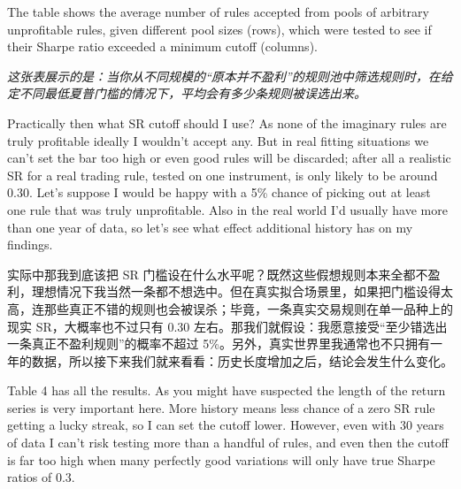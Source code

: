 \begin{englishblock} The table shows the average number of rules accepted from pools of arbitrary unprofitable rules, given different pool sizes (rows), which were tested to see if their Sharpe ratio exceeded a minimum cutoff (columns). \end{englishblock}

\begin{chineseblock} \textit{这张表展示的是：当你从不同规模的“原本并不盈利”的规则池中筛选规则时，在给定不同最低夏普门槛的情况下，平均会有多少条规则被误选出来。}\end{chineseblock}

\bipairgap

\begin{englishblock} Practically then what SR cutoff should I use? As none of the imaginary rules are truly profitable ideally I wouldn't accept any. But in real fitting situations we can't set the bar too high or even good rules will be discarded; after all a realistic SR for a real trading rule, tested on one instrument, is only likely to be around 0.30. Let's suppose I would be happy with a 5\% chance of picking out at least one rule that was truly unprofitable. Also in the real world I'd usually have more than one year of data, so let's see what effect additional history has on my findings. \end{englishblock}

\begin{chineseblock}实际中那我到底该把 SR 门槛设在什么水平呢？既然这些假想规则本来全都不盈利，理想情况下我当然一条都不想选中。但在真实拟合场景里，如果把门槛设得太高，连那些真正不错的规则也会被误杀；毕竟，一条真实交易规则在单一品种上的现实 SR，大概率也不过只有 0.30 左右。那我们就假设：我愿意接受“至少错选出一条真正不盈利规则”的概率不超过 5\%。另外，真实世界里我通常也不只拥有一年的数据，所以接下来我们就来看看：历史长度增加之后，结论会发生什么变化。\end{chineseblock}

\bipairgap

\begin{englishblock} Table 4 has all the results. As you might have suspected the length of the return series is very important here. More history means less chance of a zero SR rule getting a lucky streak, so I can set the cutoff lower. However, even with 30 years of data I can't risk testing more than a handful of rules, and even then the cutoff is far too high when many perfectly good variations will only have true Sharpe ratios of 0.3. \end{englishblock}

